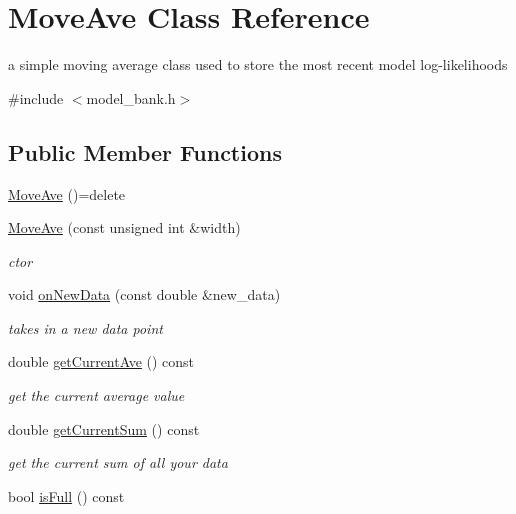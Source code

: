 \hypertarget{classMoveAve}{}\section{Move\+Ave Class Reference}
\label{classMoveAve}


a simple moving average class used to store the most recent model log-\/likelihoods  




{\ttfamily \#include $<$model\+\_\+bank.\+h$>$}

\subsection*{Public Member Functions}
\begin{DoxyCompactItemize}
\item 
\hyperlink{classMoveAve_a7ba3aea659277902e633d1fca06ddc36}{Move\+Ave} ()=delete
\item 
\hyperlink{classMoveAve_a455db6dea545c3bb47fed299740c5031}{Move\+Ave} (const unsigned int \&width)
\begin{DoxyCompactList}\small\item\em ctor \end{DoxyCompactList}\item 
void \hyperlink{classMoveAve_aedeb10294b2e248f27deb43e30b4a1fc}{on\+New\+Data} (const double \&new\+\_\+data)
\begin{DoxyCompactList}\small\item\em takes in a new data point \end{DoxyCompactList}\item 
double \hyperlink{classMoveAve_a5a48674a3d3a2d92baf896d8321cd909}{get\+Current\+Ave} () const
\begin{DoxyCompactList}\small\item\em get the current average value \end{DoxyCompactList}\item 
double \hyperlink{classMoveAve_a8976714955c304bea3149c51e0c8cd95}{get\+Current\+Sum} () const
\begin{DoxyCompactList}\small\item\em get the current sum of all your data \end{DoxyCompactList}\item 
bool \hyperlink{classMoveAve_a2511f0602d9bffdb8ddc8cd31d81ef66}{is\+Full} () const
\end{DoxyCompactItemize}


